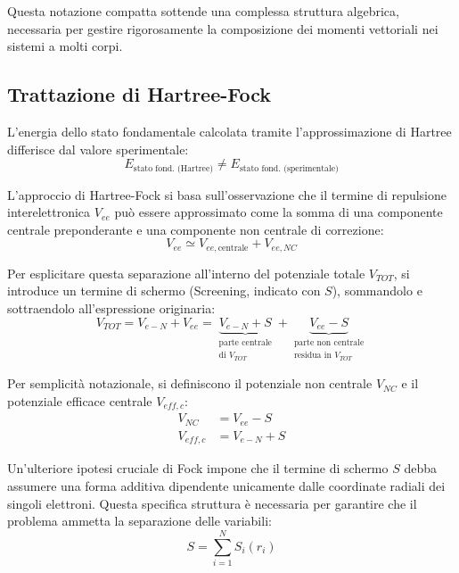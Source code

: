Questa notazione compatta sottende una complessa struttura algebrica, necessaria per gestire rigorosamente la composizione dei momenti vettoriali nei sistemi a molti corpi.

\subsection{Trattazione di Hartree-Fock}

L'energia dello stato fondamentale calcolata tramite l'approssimazione di Hartree differisce dal valore sperimentale:
\begin{equation}
    E_{\text{stato fond. (Hartree)}} \neq E_{\text{stato fond. (sperimentale)}}
\end{equation}

L'approccio di Hartree-Fock si basa sull'osservazione che il termine di repulsione interelettronica \( V_{ee} \) può essere approssimato come la somma di una componente centrale preponderante e una componente non centrale di correzione:
\begin{equation}
    V_{ee} \simeq V_{ee,\text{centrale}} + V_{ee,NC}
\end{equation}

Per esplicitare questa separazione all'interno del potenziale totale \( V_{TOT} \), si introduce un termine di schermo (Screening, indicato con \( S \)), sommandolo e sottraendolo all'espressione originaria:
\begin{equation}
    V_{TOT} = V_{e-N} + V_{ee} = \underbrace{V_{e-N} + S}_{\substack{\text{parte centrale} \\ \text{di } V_{TOT}}} + \underbrace{V_{ee} - S}_{\substack{\text{parte non centrale} \\ \text{residua in } V_{TOT}}}
\end{equation}

Per semplicità notazionale, si definiscono il potenziale non centrale \( V_{NC} \) e il potenziale efficace centrale \( V_{eff,c} \):
\begin{align}
    V_{NC} &= V_{ee} - S \\
    V_{eff,c} &= V_{e-N} + S
\end{align}

Un'ulteriore ipotesi cruciale di Fock impone che il termine di schermo \( S \) debba assumere una forma additiva dipendente unicamente dalle coordinate radiali dei singoli elettroni. Questa specifica struttura è necessaria per garantire che il problema ammetta la separazione delle variabili:
\begin{equation}
    S = \sum_{i=1}^{N} S_i(r_i)
\end{equation}

